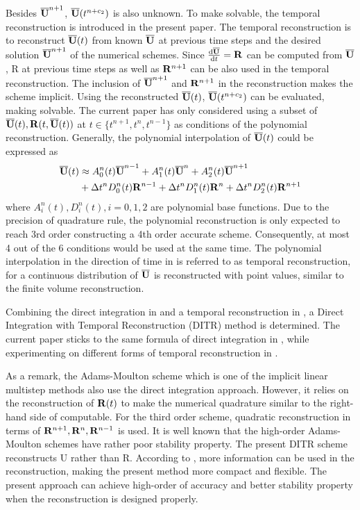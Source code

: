 Besides $\overline{\mathbf{U}}^{n+1}$, $\overline{\mathbf{U}}(t^{n+c_2})$ is also unknown.
To make 
solvable, the temporal reconstruction is introduced in the
present paper.
The temporal reconstruction is to reconstruct $\overline{\mathbf{U}}(t)$
from known $\overline{\mathbf{U}}$ at previous time steps and the desired
solution $\overline{\mathbf{U}}^{n+1}$ of the numerical schemes. Since $\frac{\dd\overline{\mathbf{U}}}{\dd t}=\mathbf{R}$
can be computed from  $\overline{\mathbf{U}}$, R at previous time steps as well
as  $\mathbf{R}^{n+1}$ can be also used in the temporal reconstruction.
The inclusion of $\overline{\mathbf{U}}^{n+1}$ and $\mathbf{R}^{n+1}$ in the reconstruction
makes the scheme implicit.
Using the reconstructed $\overline{\mathbf{U}}(t)$, $\overline{\mathbf{U}}(t^{n+c_2})$
can be evaluated, making  solvable.
The current paper has only considered using a subset of
$\overline{\mathbf{U}}(t), \mathbf{R}(t, \overline{\mathbf{U}}(t))$ at $t \in \{t^{n+1}, t^n, t^{n-1}\}$
as conditions of the polynomial reconstruction.
Generally, the polynomial interpolation
of $\overline{\mathbf{U}}(t)$ could be expressed as
\begin{equation}
    \begin{aligned}
        \label{eq:TR}
        \overline{\mathbf{U}}(t) & \approx
        A^n_0(t)\overline{\mathbf{U}}^{n - 1} +
        A^n_1(t)\overline{\mathbf{U}}^{n} +
        A^n_2(t)\overline{\mathbf{U}}^{n + 1}
        \\ & +
        \mathrm\Delta t^n D^n_0(t)\mathbf{R}^{n - 1} +
        \mathrm\Delta t^n D^n_1(t)\mathbf{R}^{n} +
        \mathrm\Delta t^n D^n_2(t)\mathbf{R}^{n + 1}
    \end{aligned}
\end{equation}
where $A^n_i(t), D^n_i(t), i=0,1,2$
are polynomial base functions. Due to the precision of quadrature rule,
the polynomial reconstruction is only expected to reach 3rd order
constructing a 4th order accurate scheme.
Consequently, at most 4 out of the
6 conditions would be used at the same time.
The polynomial interpolation in the direction of time in 
is referred to as temporal reconstruction, for
a continuous distribution of $\overline{\mathbf{U}}$ is reconstructed with point values,
similar to the finite volume reconstruction.

Combining the direct integration in 
and a  temporal reconstruction in ,
a Direct Integration with Temporal Reconstruction (DITR) method is
determined.
The current paper sticks to the same formula of direct integration
in , while experimenting on different
forms of temporal reconstruction in .

As a remark, the Adams-Moulton scheme which is one of the
implicit linear multistep methods also use the direct
integration approach.
However, it relies on the
reconstruction of $\mathbf{R}(t)$ to make the numerical quadrature
similar to the right-hand side of  computable.
For the third order scheme, quadratic reconstruction in terms
of $\mathbf{R}^{n+1},\mathbf{R}^{n},\mathbf{R}^{n-1}$ is used.
It is well known that the high-order
Adams-Moulton schemes have rather poor stability
property. The present DITR scheme reconstructs U rather
than R. According to ,
more information can be used
in the reconstruction, making the present method more
compact and flexible. The present approach can achieve
high-order of accuracy and better stability property when
the reconstruction is designed properly.

